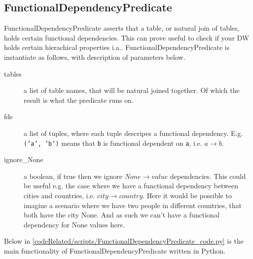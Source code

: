 \subsection{FunctionalDependencyPredicate}
FunctionalDependencyPredicate asserts that a table, or natural join of tables, holds certain functional dependencies. This can prove useful to check if your DW holds certain hierachical properties i.a.. FunctionalDependencyPredicate is instantiate as follows, with description of parameters below.


\begin{description}
\item [tables] a list of table names, that will be natural joined together. Of which the result is what the predicate runs on.
\item [fds] a list of tuples, where each tuple descripes a functional dependency. E.g. \texttt{('a', 'b')} means that \texttt{b} is functional dependent on \texttt{a}, i.e. $a \rightarrow b$.
\item [ignore\_None] a boolean, if true then we ignore $None \rightarrow value$ dependencies. This could be useful e.g. the case where we have a functional dependency between cities and countries, i.e. $city \rightarrow country$. Here it would be possible to imagine a scenario where we have two people in different countries, that both have the city None. And as such we can't have a functional dependency for None values here.
  
\end{description}

Below in \cref{codeRelated/scripts/FunctionalDependencyPredicate_code.py} is the main functionality of FunctionalDependencyPredicate written in Python.


